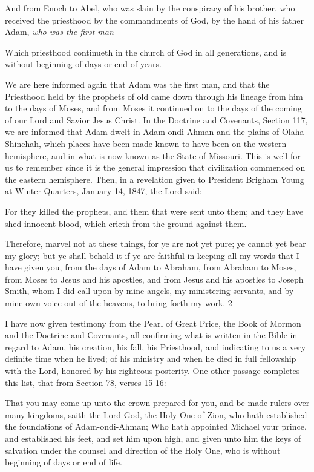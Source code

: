 And from Enoch to Abel, who was slain by the conspiracy of his brother, who received the
priesthood by the commandments of God, by the hand of his father Adam, \textit{who was the first
man—}

Which priesthood continueth in the church of God in all generations, and is without
beginning of days or end of years.

We are here informed again that Adam was the first man, and that the Priesthood held by the
prophets of old came down through his lineage from him to the days of Moses, and from
Moses it continued on to the days of the coming of our Lord and Savior Jesus Christ. In the
Doctrine and Covenants, Section 117, we are informed that Adam dwelt in Adam-ondi-Ahman and the plains of Olaha Shinehah, which places have been made known to have been
on the western hemisphere, and in what is now known as the State of Missouri. This is well
for us to remember since it is the general impression that civilization commenced on the
eastern hemisphere. Then, in a revelation given to President Brigham Young at Winter
Quarters, January 14, 1847, the Lord said:

For they killed the prophets, and them that were sent unto them; and they have shed innocent
blood, which crieth from the ground against them.

Therefore, marvel not at these things, for ye are not yet pure; ye cannot yet bear my glory;
but ye shall behold it if ye are faithful in keeping all my words that I have given you, from
the days of Adam to Abraham, from Abraham to Moses, from Moses to Jesus and his
apostles, and from Jesus and his apostles to Joseph Smith, whom I did call upon by mine
angels, my ministering servants, and by mine own voice out of the heavens, to bring forth my
work. 2

I have now given testimony from the Pearl of Great Price, the Book of Mormon and the
Doctrine and Covenants, all confirming what is written in the Bible in regard to Adam, his
creation, his fall, his Priesthood, and indicating to us a very definite time when he lived; of
his ministry and when he died in full fellowship with the Lord, honored by his righteous
posterity. One other passage completes this list, that from Section 78, verses 15-16:

That you may come up unto the crown prepared for you, and be made rulers over many
kingdoms, saith the Lord God, the Holy One of Zion, who hath established the foundations of
Adam-ondi-Ahman; Who hath appointed Michael your prince, and established his feet, and
set him upon high, and given unto him the keys of salvation under the counsel and direction
of the Holy One, who is without beginning of days or end of life.


